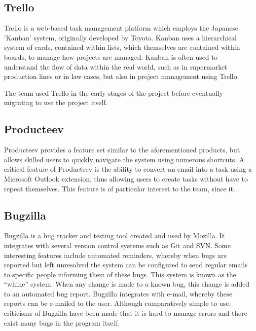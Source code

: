 \documentclass[a4paper]{l3proj}
\begin{document}
\subsection{Trello}
\label{trello}\par
Trello is a web-based task management platform which employs the Japanese 'Kanban'
system, originally developed by Toyota. Kanban uses a hierarchical system of
cards, contained within lists, which themselves are contained within boards, to
manage how projects are managed. Kanban is often used to understand the flow of data within the real world, such as in supermarket production lines or in law cases, but also in project management using Trello.

The team used Trello in the early stages of the project before eventually migrating to use the project itself.

\subsection{Producteev}
\label{producteev}

Producteev provides a feature set similar to the aforementioned products, but allows skilled users to quickly navigate the system using numerous shortcuts. A critical feature of Producteev is the ability to convert an email into a task using a Microsoft Outlook extension, thus allowing users to create tasks without have to repeat themselves. This feature is of particular interest to the team, since it... 

\subsection{Bugzilla}
\label{Bugzilla}

Bugzilla is a bug tracker and testing tool created and used by Mozilla. It integrates with several version control systems such as Git and SVN.  Some interesting features include automated reminders, whereby when bugs are reported but left unresolved the system can be configured to send regular emails to specific people informing them of these bugs. This system is known as the ``whine'' system.  When any change is made to a known bug, this change is added to an automated bug report.  Bugzilla integrates with e-mail, whereby these reports can be e-mailed to the user. Although comparatively simple to use, criticisms of Bugzilla have been made that it is hard to manage errors and there exist many bugs in the program itself.
\end{document}
